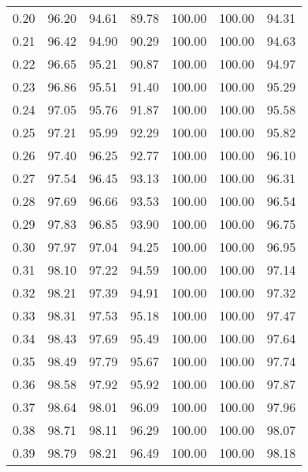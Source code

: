 \begin{tabular}{|c|c|c|c|c|c|c|}
      0.20 &     96.20 &     94.61 &      89.78 &  100.00 &     100.00 &         94.31 \\
      0.21 &     96.42 &     94.90 &      90.29 &  100.00 &     100.00 &         94.63 \\
      0.22 &     96.65 &     95.21 &      90.87 &  100.00 &     100.00 &         94.97 \\
      0.23 &     96.86 &     95.51 &      91.40 &  100.00 &     100.00 &         95.29 \\
      0.24 &     97.05 &     95.76 &      91.87 &  100.00 &     100.00 &         95.58 \\
      0.25 &     97.21 &     95.99 &      92.29 &  100.00 &     100.00 &         95.82 \\
      0.26 &     97.40 &     96.25 &      92.77 &  100.00 &     100.00 &         96.10 \\
      0.27 &     97.54 &     96.45 &      93.13 &  100.00 &     100.00 &         96.31 \\
      0.28 &     97.69 &     96.66 &      93.53 &  100.00 &     100.00 &         96.54 \\
      0.29 &     97.83 &     96.85 &      93.90 &  100.00 &     100.00 &         96.75 \\
      0.30 &     97.97 &     97.04 &      94.25 &  100.00 &     100.00 &         96.95 \\
      0.31 &     98.10 &     97.22 &      94.59 &  100.00 &     100.00 &         97.14 \\
      0.32 &     98.21 &     97.39 &      94.91 &  100.00 &     100.00 &         97.32 \\
      0.33 &     98.31 &     97.53 &      95.18 &  100.00 &     100.00 &         97.47 \\
      0.34 &     98.43 &     97.69 &      95.49 &  100.00 &     100.00 &         97.64 \\
      0.35 &     98.49 &     97.79 &      95.67 &  100.00 &     100.00 &         97.74 \\
      0.36 &     98.58 &     97.92 &      95.92 &  100.00 &     100.00 &         97.87 \\
      0.37 &     98.64 &     98.01 &      96.09 &  100.00 &     100.00 &         97.96 \\
      0.38 &     98.71 &     98.11 &      96.29 &  100.00 &     100.00 &         98.07 \\
      0.39 &     98.79 &     98.21 &      96.49 &  100.00 &     100.00 &         98.18 \\

\end{tabular}
